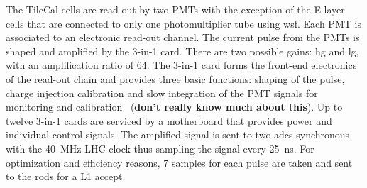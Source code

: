 The TileCal cells are read out by two PMTs with the exception of the E layer
cells that are connected to only one photomultiplier tube using \gls{wsf}. Each
PMT is associated to an electronic read-out channel. The current pulse from the
PMTs is shaped and amplified by the 3-in-1 card. There are two possible gains:
\gls{hg} and \gls{lg}, with an amplification ratio of 64. The 3-in-1 card forms
the front-end electronics of the read-out chain and provides three basic
functions: shaping of the pulse, charge injection calibration and slow
integration of the PMT signals for monitoring and calibration~\cite{TileCal}
(\textbf{don't really know much about this}). Up to twelve 3-in-1 cards are
serviced by a motherboard that provides power and individual control signals.
The amplified signal is sent to two \glspl{adc} synchronous with the 40~MHz LHC
clock thus sampling the signal every 25~ns. For optimization and efficiency
reasons, 7 samples for each pulse are taken and sent to the \glspl{rod} for a L1
accept.
